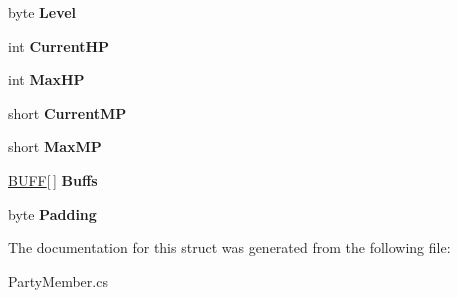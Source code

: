 \begin{DoxyCompactItemize}
\item 
\hypertarget{structffxivlib_1_1_party_member_1_1_p_a_r_t_y_m_e_m_b_e_r_i_n_f_o_a05295eb7f0790435d82888e9c5f08d1a}{byte {\bfseries Level}}\label{structffxivlib_1_1_party_member_1_1_p_a_r_t_y_m_e_m_b_e_r_i_n_f_o_a05295eb7f0790435d82888e9c5f08d1a}

\item 
\hypertarget{structffxivlib_1_1_party_member_1_1_p_a_r_t_y_m_e_m_b_e_r_i_n_f_o_a1d9427bd9ce30843b7d4c4e29c28a16a}{int {\bfseries Current\-H\-P}}\label{structffxivlib_1_1_party_member_1_1_p_a_r_t_y_m_e_m_b_e_r_i_n_f_o_a1d9427bd9ce30843b7d4c4e29c28a16a}

\item 
\hypertarget{structffxivlib_1_1_party_member_1_1_p_a_r_t_y_m_e_m_b_e_r_i_n_f_o_a3e45ae06ea2e1098cf26eacd30c338fc}{int {\bfseries Max\-H\-P}}\label{structffxivlib_1_1_party_member_1_1_p_a_r_t_y_m_e_m_b_e_r_i_n_f_o_a3e45ae06ea2e1098cf26eacd30c338fc}

\item 
\hypertarget{structffxivlib_1_1_party_member_1_1_p_a_r_t_y_m_e_m_b_e_r_i_n_f_o_a12016e23f995e1eaf0a6b29a6415e023}{short {\bfseries Current\-M\-P}}\label{structffxivlib_1_1_party_member_1_1_p_a_r_t_y_m_e_m_b_e_r_i_n_f_o_a12016e23f995e1eaf0a6b29a6415e023}

\item 
\hypertarget{structffxivlib_1_1_party_member_1_1_p_a_r_t_y_m_e_m_b_e_r_i_n_f_o_a0b96e59da156166218c14e5b3dbac358}{short {\bfseries Max\-M\-P}}\label{structffxivlib_1_1_party_member_1_1_p_a_r_t_y_m_e_m_b_e_r_i_n_f_o_a0b96e59da156166218c14e5b3dbac358}

\item 
\hypertarget{structffxivlib_1_1_party_member_1_1_p_a_r_t_y_m_e_m_b_e_r_i_n_f_o_a4c8d954120cef417eeef5220fc805c4d}{\hyperlink{structffxivlib_1_1_b_u_f_f}{B\-U\-F\-F}\mbox{[}$\,$\mbox{]} {\bfseries Buffs}}\label{structffxivlib_1_1_party_member_1_1_p_a_r_t_y_m_e_m_b_e_r_i_n_f_o_a4c8d954120cef417eeef5220fc805c4d}

\item 
\hypertarget{structffxivlib_1_1_party_member_1_1_p_a_r_t_y_m_e_m_b_e_r_i_n_f_o_a6d514fb5cc8a15c0cb053e94261f56f3}{byte {\bfseries Padding}}\label{structffxivlib_1_1_party_member_1_1_p_a_r_t_y_m_e_m_b_e_r_i_n_f_o_a6d514fb5cc8a15c0cb053e94261f56f3}

\end{DoxyCompactItemize}


The documentation for this struct was generated from the following file\-:\begin{DoxyCompactItemize}
\item 
Party\-Member.\-cs\end{DoxyCompactItemize}
